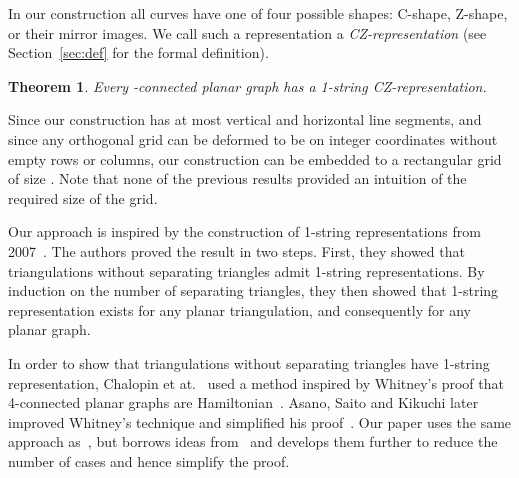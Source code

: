 \documentclass{article}
\newtheorem{theorem}{Theorem}[section]
\begin{document}
In our construction all curves have one of four
possible shapes: C-shape, Z-shape, or their mirror images. We call such a 
representation a \emph{CZ-representation} (see Section~\ref{sec:def} for
the formal definition).

\begin{theorem}
\label{thm:main-claim}
Every -connected planar graph has a 1-string CZ-rep\-re\-sen\-ta\-tion. 
\end{theorem}



Since our construction has at most  vertical and  horizontal line segments, and
since any orthogonal grid can be deformed to be on integer coordinates 
without empty rows
or columns, our construction can be embedded to a rectangular grid of size .
Note that none of the previous results provided an intuition of the required size of the grid.

Our approach is inspired by the construction of 1-string representations from 
2007~\cite{cit:chalopin-gonclaves-ochem, cit:chalopin-string}. 
The authors proved the result in two steps. First,
they showed that triangulations without separating triangles 
admit 1-string representations. By induction on the number of 
separating triangles, they then showed that 1-string representation
exists for any planar triangulation, and consequently for any 
planar graph. 

In order to show that triangulations without separating triangles
have 1-string representation, Chalopin et at.~\cite{cit:chalopin-string} used
a method inspired by Whitney's proof that 4-connected planar graphs
are Hamiltonian~\cite{cit:whitney}. Asano, Saito and Kikuchi later improved
Whitney's technique and simplified his proof~\cite{cit:ham-cycle}. 
Our paper uses the same approach as~\cite{cit:chalopin-string}, but borrows ideas from~\cite{cit:ham-cycle}
and develops them further to reduce the number of cases and hence
simplify the proof. 


\iffalse
A~CZ-representation uses two bends for every curve, thus our result
implies that triangulations with no separating triangles as 2-VPG. 
Our construction uses precisely one intersection per edge. Thus, it is 
stronger than the result of~\cite{cit:chaplick} for this specific subclass
of planar graphs.

Furthermore, the result presented here immediately implies that planar triangulations
with no separating triangles have 1-string representations, which is an intermediate
step of~\cite{cit:chalopin-string} for showing that this is true for all planar graphs.
Compared to~\cite{cit:chalopin-string}, our approach significantly reduces the number of analysed cases.
\fi
\end{document}
